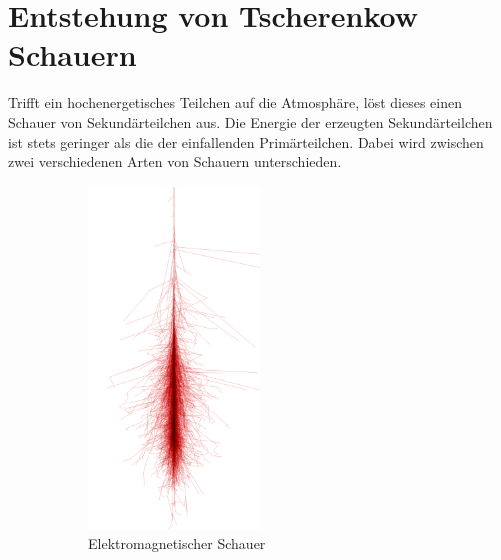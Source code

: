 \chapter{Entstehung von Tscherenkow Schauern}
\label{sec:cherenkov}
Trifft ein hochenergetisches Teilchen auf die Atmosphäre, löst dieses einen Schauer von Sekundärteilchen aus. 
Die Energie der erzeugten Sekundärteilchen ist stets geringer als die der einfallenden Primärteilchen. 
Dabei wird zwischen zwei verschiedenen Arten von Schauern unterschieden. 
\begin{figure}[H]
  \centering
  \begin{subfigure}[t]{0.49\textwidth}
  	\centering
	\includegraphics[width=0.5\textwidth]{images/photon_100GeV.png}
	\caption{Elektromagnetischer Schauer}
  \end{subfigure}
  \begin{subfigure}[t]{0.49\textwidth}
  	\centering

\end{subfigure}
\end{figure}
